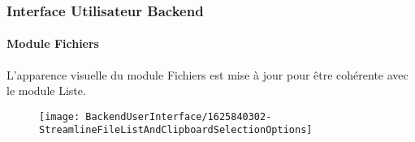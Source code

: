 %

\begin{frame}[fragile]
	\frametitle{Interface Utilisateur Backend}
	\framesubtitle{Module Fichiers}

    L'apparence visuelle du module Fichiers est mise à jour pour être
    cohérente avec le module Liste.

	\begin{figure}
		\texttt{[image: BackendUserInterface/1625840302-StreamlineFileListAndClipboardSelectionOptions]}
	\end{figure}

\end{frame}

